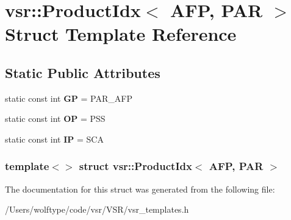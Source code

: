 \hypertarget{structvsr_1_1_product_idx_3_01_a_f_p_00_01_p_a_r_01_4}{\section{vsr\-:\-:Product\-Idx$<$ A\-F\-P, P\-A\-R $>$ Struct Template Reference}
\label{structvsr_1_1_product_idx_3_01_a_f_p_00_01_p_a_r_01_4}
}
\subsection*{Static Public Attributes}
\begin{DoxyCompactItemize}
\item 
\hypertarget{structvsr_1_1_product_idx_3_01_a_f_p_00_01_p_a_r_01_4_a8f7b8095c830510ea5f0ce904653977d}{static const int {\bfseries G\-P} = P\-A\-R\-\_\-\-A\-F\-P}\label{structvsr_1_1_product_idx_3_01_a_f_p_00_01_p_a_r_01_4_a8f7b8095c830510ea5f0ce904653977d}

\item 
\hypertarget{structvsr_1_1_product_idx_3_01_a_f_p_00_01_p_a_r_01_4_a60307ab56b7493cdc77083a68f57642d}{static const int {\bfseries O\-P} = P\-S\-S}\label{structvsr_1_1_product_idx_3_01_a_f_p_00_01_p_a_r_01_4_a60307ab56b7493cdc77083a68f57642d}

\item 
\hypertarget{structvsr_1_1_product_idx_3_01_a_f_p_00_01_p_a_r_01_4_ac8fae9ec23e9855403aece225afe6cde}{static const int {\bfseries I\-P} = S\-C\-A}\label{structvsr_1_1_product_idx_3_01_a_f_p_00_01_p_a_r_01_4_ac8fae9ec23e9855403aece225afe6cde}

\end{DoxyCompactItemize}
\subsubsection*{template$<$$>$ struct vsr\-::\-Product\-Idx$<$ A\-F\-P, P\-A\-R $>$}



The documentation for this struct was generated from the following file\-:\begin{DoxyCompactItemize}
\item 
/\-Users/wolftype/code/vsr/\-V\-S\-R/vsr\-\_\-templates.\-h\end{DoxyCompactItemize}
